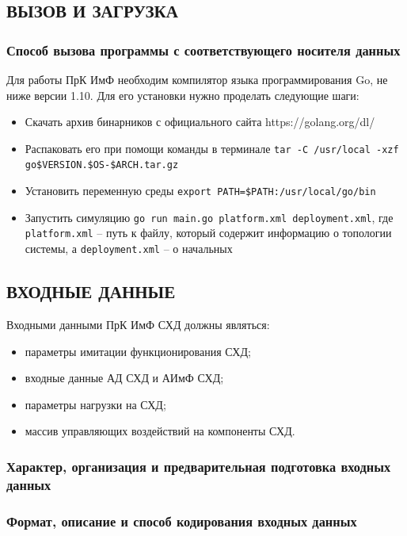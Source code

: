 \subsection{ВЫЗОВ И ЗАГРУЗКА}

\subsubsection{Способ вызова программы с соответствующего носителя данных}

Для работы ПрК ИмФ необходим компилятор языка программирования Go, не ниже версии 1.10.  Для его установки нужно проделать следующие шаги:
\begin{itemize}
	\item Скачать архив бинарников с официального сайта https://golang.org/dl/
	\item Распаковать его при помощи команды в терминале \verb|tar -C /usr/local -xzf go$VERSION.$OS-$ARCH.tar.gz|
	\item Установить переменную среды \verb|export PATH=$PATH:/usr/local/go/bin|
	\item Запустить симуляцию \verb|go run main.go platform.xml deployment.xml|, где \verb|platform.xml| -- путь к файлу, который содержит информацию о топологии системы, а \verb|deployment.xml| -- о начальных 
	
\end{itemize}


\subsection{ВХОДНЫЕ ДАННЫЕ}
Входными данными ПрК ИмФ СХД должны являться:
\begin{itemize}
	
\item параметры имитации функционирования СХД;
\item входные данные АД СХД и АИмФ СХД;
\item параметры нагрузки на СХД;
\item массив управляющих воздействий на компоненты СХД.

\end{itemize}
\subsubsection{Характер, организация и предварительная подготовка входных данных}


\subsubsection{Формат, описание и способ кодирования входных данных}

